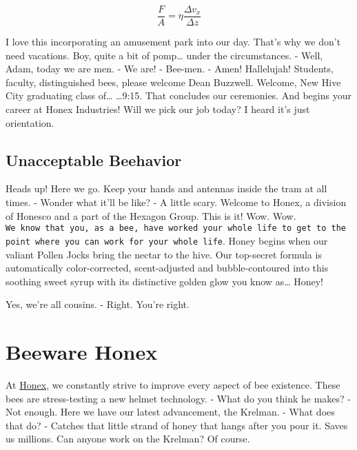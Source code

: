 \documentclass[
  letterpaper,
  twocolumn]{article}
\newenvironment{Shaded}{}{}
\newcommand{\BuiltInTok}[1]{#1}
\newcommand{\NormalTok}[1]{#1}
\newcommand{\OperatorTok}[1]{\textcolor[rgb]{0.40,0.40,0.40}{#1}}
\newcommand{\SpecialCharTok}[1]{\textcolor[rgb]{0.25,0.44,0.63}{#1}}
\newcommand{\StringTok}[1]{\textcolor[rgb]{0.25,0.44,0.63}{#1}}
\begin{document}
\[ \frac{F}{A} = \eta \frac{\Delta v_x}{\Delta z} \]

I love this incorporating an amusement park into our day. That's why we
don't need vacations. Boy, quite a bit of pomp\ldots{} under the
circumstances. - Well, Adam, today we are men. - We are! - Bee-men. -
Amen! Hallelujah! Students, faculty, distinguished bees, please welcome
Dean Buzzwell. Welcome, New Hive City graduating class of\ldots{}
\ldots9:15. That concludes our ceremonies. And begins your career at
Honex Industries! Will we pick our job today? I heard it's just
orientation.

\hypertarget{unacceptable-beehavior}{%
\subsection{Unacceptable Beehavior}\label{unacceptable-beehavior}}

Heads up! Here we go. Keep your hands and antennas inside the tram at
all times. - Wonder what it'll be like? - A little scary. Welcome to
Honex, a division of Honesco and a part of the Hexagon Group. This is
it! Wow. Wow.
\texttt{We\ know\ that\ you,\ as\ a\ bee,\ have\ worked\ your\ whole\ life\ to\ get\ to\ the\ point\ where\ you\ can\ work\ for\ your\ whole\ life}.
Honey begins when our valiant Pollen Jocks bring the nectar to the hive.
Our top-secret formula is automatically color-corrected, scent-adjusted
and bubble-contoured into this soothing sweet syrup with its distinctive
golden glow you know as\ldots{} Honey!

\begin{Shaded}
\end{Shaded}

Yes, we're all cousins. - Right. You're right.

\hypertarget{beeware-honex}{%
\section{Beeware Honex}\label{beeware-honex}}

At \href{https://www.amazon.com/}{Honex}, we constantly strive to
improve every aspect of bee existence. These bees are stress-testing a
new helmet technology. - What do you think he makes? - Not enough. Here
we have our latest advancement, the Krelman. - What does that do? -
Catches that little strand of honey that hangs after you pour it. Saves
us millions. Can anyone work on the Krelman? Of course.
\end{document}
